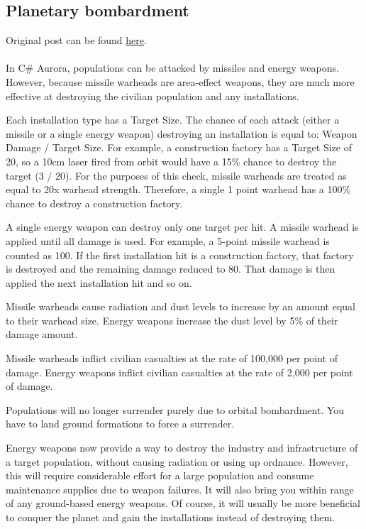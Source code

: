 \documentclass[../../Aurora C# unofficial manual.tex]{subfiles}
\begin{document}
	\subsection{Planetary bombardment}
	Original post can be found
	\href{http://aurora2.pentarch.org/index.php?topic=8495.msg107703#msg107703}{here}.
	\\\\
	
	In C\# Aurora, populations can be attacked by missiles and energy weapons. However, because missile warheads are area-effect weapons, they are much more effective at destroying the civilian population and any installations.
	
	Each installation type has a Target Size. The chance of each attack (either a missile or a single energy weapon) destroying an installation is equal to: Weapon Damage / Target Size. For example, a construction factory has a Target Size of 20, so a 10cm laser fired from orbit would have a 15\% chance to destroy the target (3 / 20). For the purposes of this check, missile warheads are treated as equal to 20x warhead strength. Therefore, a single 1 point warhead has a 100\% chance to destroy a construction factory.
	
	A single energy weapon can destroy only one target per hit. A missile warhead is applied until all damage is used. For example, a 5-point missile warhead is counted as 100. If the first installation hit is a construction factory, that factory is destroyed and the remaining damage reduced to 80. That damage is then applied the next installation hit and so on.
	
	Missile warheads cause radiation and dust levels to increase by an amount equal to their warhead size. Energy weapons increase the dust level by 5\% of their damage amount.
	
	Missile warheads inflict civilian casualties at the rate of 100,000 per point of damage. Energy weapons inflict civilian casualties at the rate of 2,000 per point of damage.
	
	Populations will no longer surrender purely due to orbital bombardment. You have to land ground formations to force a surrender.
	
	Energy weapons now provide a way to destroy the industry and infrastructure of a target population, without causing radiation or using up ordnance. However, this will require considerable effort for a large population and consume maintenance supplies due to weapon failures. It will also bring you within range of any ground-based energy weapons. Of course, it will usually be more beneficial to conquer the planet and gain the installations instead of destroying them.
	
\end{document}
